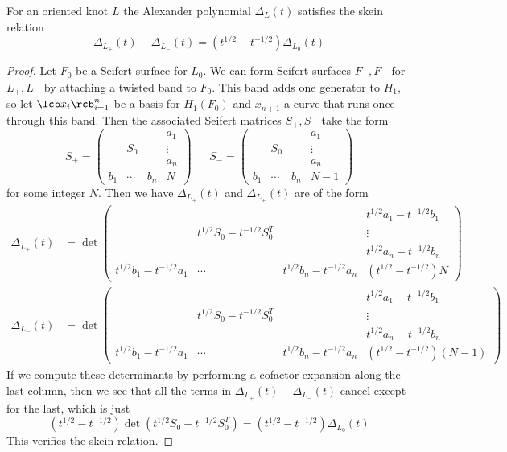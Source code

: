 \begin{thm}
For an oriented knot $L$ the Alexander polynomial $\Delta_L(t)$ satisfies the skein relation
\[ \Delta_{L_+}(t) - \Delta_{L_-}(t) = (t^{1/2}-t^{-1/2}) \Delta_{L_0}(t) \]
\end{thm}
\begin{proof}
Let $F_0$ be a Seifert surface for $L_0$. We can form Seifert surfaces $F_+,F_-$ for $L_+,L_-$ by attaching a twisted band to $F_0$. This band adds one generator to $H_1$, so let $\lcb x_i \rcb_{i=1}^n$ be a basis for $H_1(F_0)$ and $x_{n+1}$ a curve that runs once through this band. Then the associated Seifert matrices $S_+,S_-$ take the form
\[ S_+ = \begin{pmatrix} & & & a_1 \\ & S_0 & & \vdots \\ & & & a_n \\ b_1 & \cdots & b_n & N \end{pmatrix} \ \ \ \ \ \ \ S_- = \begin{pmatrix} & & & a_1 \\ & S_0 & & \vdots \\ & & & a_n \\ b_1 & \cdots & b_n & N-1 \end{pmatrix} \]
for some integer $N$. Then we have $\Delta_{L_+}(t)$ and $\Delta_{L_+}(t)$ are of the form
\begin{align*}
\Delta_{L_+}(t) &= \det\begin{pmatrix} & & & t^{1/2}a_1-t^{-1/2}b_1 \\ & t^{1/2}S_0-t^{-1/2}S_0^T & & \vdots \\ & & & t^{1/2}a_n-t^{-1/2}b_n \\ t^{1/2}b_1-t^{-1/2}a_1 & \cdots & t^{1/2}b_n-t^{-1/2}a_n & (t^{1/2}-t^{-1/2})N  \end{pmatrix} \\
\Delta_{L_-}(t) &= \det\begin{pmatrix} & & & t^{1/2}a_1-t^{-1/2}b_1 \\ & t^{1/2}S_0-t^{-1/2}S_0^T & & \vdots \\ & & & t^{1/2}a_n-t^{-1/2}b_n \\ t^{1/2}b_1-t^{-1/2}a_1 & \cdots & t^{1/2}b_n-t^{-1/2}a_n & (t^{1/2}-t^{-1/2})(N-1)  \end{pmatrix} 
\end{align*}
If we compute these determinants by performing a cofactor expansion along the last column, then we see that all the terms in $\Delta_{L_+}(t)-\Delta_{L_-}(t)$ cancel except for the last, which is just
\[ (t^{1/2}-t^{-1/2}) \det(t^{1/2}S_0-t^{-1/2}S_0^T) = (t^{1/2}-t^{-1/2})\Delta_{L_0}(t) \]
This verifies the skein relation.
\end{proof}


